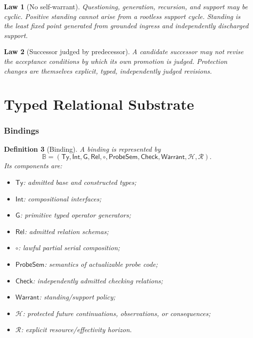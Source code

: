 \documentclass[11pt,oneside]{article}
\newtheorem{definition}{Definition}[section]
\newtheorem{law}[definition]{Law}
\newcommand{\B}{\mathbb B}
\begin{document}
\begin{law}[No self-warrant]
Questioning, generation, recursion, and support may be cyclic.  Positive standing cannot arise from a rootless support cycle.  Standing is the least fixed point generated from grounded ingress and independently discharged support.
\end{law}

\begin{law}[Successor judged by predecessor]
A candidate successor may not revise the acceptance conditions by which its own promotion is judged.  Protection changes are themselves explicit, typed, independently judged revisions.
\end{law}

\part{Typed Relational Substrate}

\section{Bindings}

\begin{definition}[Binding]
A binding is represented by
\[
\boxed{
\B=
(\mathsf{Ty},\mathsf{Int},\mathsf G,\mathsf{Rel},\circ,
\mathsf{ProbeSem},\mathsf{Check},\mathsf{Warrant},
\mathcal H,\mathcal R).
}
\]
Its components are:
\begin{itemize}
\item \(\mathsf{Ty}\): admitted base and constructed types;
\item \(\mathsf{Int}\): compositional interfaces;
\item \(\mathsf G\): primitive typed operator generators;
\item \(\mathsf{Rel}\): admitted relation schemas;
\item \(\circ\): lawful partial serial composition;
\item \(\mathsf{ProbeSem}\): semantics of actualizable probe code;
\item \(\mathsf{Check}\): independently admitted checking relations;
\item \(\mathsf{Warrant}\): standing/support policy;
\item \(\mathcal H\): protected future continuations, observations, or consequences;
\item \(\mathcal R\): explicit resource/effectivity horizon.
\end{itemize}
\end{definition}
\end{document}
